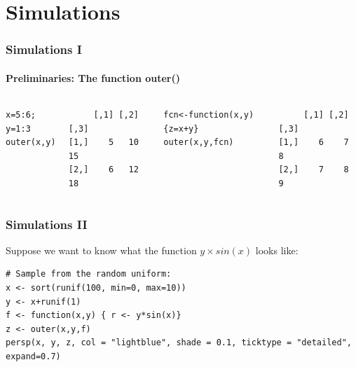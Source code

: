 

\section{Simulations}
\begin{frame}[fragile]
\frametitle{Simulations I}
\framesubtitle{Preliminaries: The function \ttfamily outer() \normalfont}

    \begin{columns}[Tc]
\begin{lstlisting}
x=5:6; y=1:3
outer(x,y)
\end{lstlisting}

\begin{beamerboxesrounded}[shadow=true]{}
\ttfamily
\begin{verbatim}
     [,1] [,2] [,3] 
[1,]    5   10   15 
[2,]    6   12   18 
\end{verbatim}
\end{beamerboxesrounded}
\normalfont

\begin{lstlisting}
fcn<-function(x,y){z=x+y}
outer(x,y,fcn)
\end{lstlisting}

\begin{beamerboxesrounded}[shadow=true]{}
\ttfamily
\begin{verbatim}
     [,1] [,2] [,3] 
[1,]    6    7    8 
[2,]    7    8    9 
\end{verbatim}
\end{beamerboxesrounded}
\normalfont
	\end{columns}
\end{frame}

\begin{frame}[fragile]
\frametitle{Simulations II}
Suppose we want to know what the function $y\times sin(x)$ looks like:

\begin{lstlisting}
# Sample from the random uniform:
x <- sort(runif(100, min=0, max=10))
y <- x+runif(1)
f <- function(x,y) { r <- y*sin(x)}
z <- outer(x,y,f)
persp(x, y, z, col = "lightblue", shade = 0.1, ticktype = "detailed", expand=0.7)
\end{lstlisting}
\end{frame}

